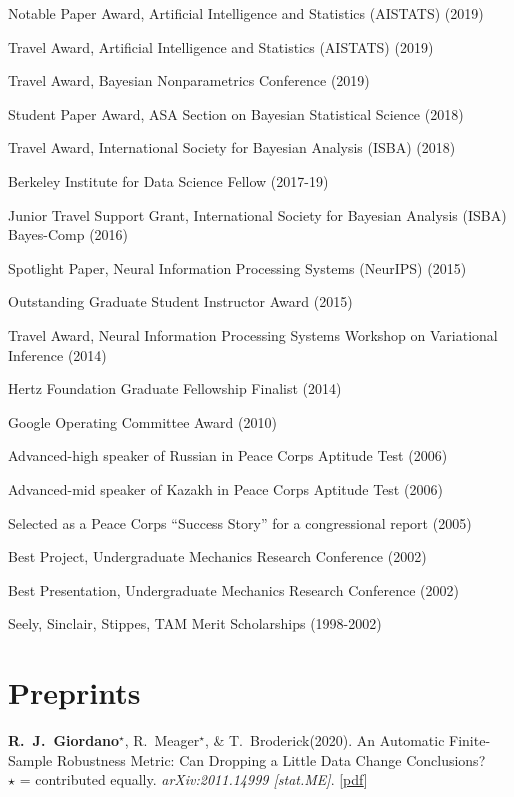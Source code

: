 \documentclass[margin,line]{res}
\newenvironment{list1}{
  \begin{list}{\ding{113}}{%
      \setlength{\itemsep}{0in}
      \setlength{\parsep}{0in} \setlength{\parskip}{0in}
      \setlength{\topsep}{0in} \setlength{\partopsep}{0in}
      \setlength{\leftmargin}{0in}}}{\end{list}} %
\newcommand{\me}{\textbf{R.~J.~Giordano}\xspace}
\newcommand{\tamara}{T.~Broderick\xspace}
\newcommand{\paperref}[1]{[\href{#1}{pdf}]}
\newcommand{\paperref}[1]{}
\begin{document}
\begin{resume}
\begin{list1}
\item[] Notable Paper Award, Artificial Intelligence and Statistics (AISTATS) (2019)
\item[] Travel Award, Artificial Intelligence and Statistics (AISTATS) (2019)
\item[] Travel Award, Bayesian Nonparametrics Conference (2019)
\item[] Student Paper Award, ASA Section on Bayesian Statistical Science (2018)
\item[] Travel Award, International Society for Bayesian Analysis (ISBA) (2018)
\item[] Berkeley Institute for Data Science Fellow (2017-19)
\item[] Junior Travel Support Grant, International Society for Bayesian Analysis (ISBA) Bayes-Comp (2016)
\item[] Spotlight Paper, Neural Information Processing Systems (NeurIPS) (2015)
\item[] Outstanding Graduate Student Instructor Award (2015)
\item[] Travel Award, Neural Information Processing Systems Workshop on Variational Inference (2014)
\item[] Hertz Foundation Graduate Fellowship Finalist (2014)
\item[] Google Operating Committee Award (2010)
\item[] Advanced-high speaker of Russian in Peace Corps Aptitude Test (2006)
\item[] Advanced-mid speaker of Kazakh in Peace Corps Aptitude Test (2006)
\item[] Selected as a Peace Corps ``Success Story'' for a congressional report (2005)
\item[] Best Project, Undergraduate Mechanics Research Conference (2002)
\item[] Best Presentation, Undergraduate Mechanics Research Conference (2002)
\item[] Seely, Sinclair, Stippes, TAM Merit Scholarships (1998-2002)

\end{list1}

\section{\sc Preprints}

\me$^\star$, R.~Meager$^\star$, \& \tamara (2020).
An Automatic Finite-Sample Robustness Metric: Can Dropping a Little Data Change Conclusions?\\
$\star$ = contributed equally.
\emph{arXiv:2011.14999 [stat.ME]}.
\paperref{https://arxiv.org/abs/2011.14999}


\end{resume}
\end{document}
